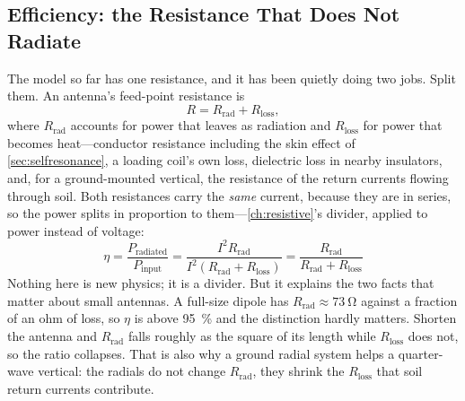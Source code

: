 \subsection{Efficiency: the Resistance That Does Not Radiate}
\label{sec:antennaeff}
The model so far has one resistance, and it has been quietly doing two jobs. Split
them. An antenna's feed-point resistance is
\[
R=R_{\text{rad}}+R_{\text{loss}},
\]
where \(R_{\text{rad}}\) accounts for power that leaves as radiation and
\(R_{\text{loss}}\) for power that becomes heat---conductor resistance including the
skin effect of \cref{sec:selfresonance}, a loading coil's own loss, dielectric loss in
nearby insulators, and, for a ground-mounted vertical, the resistance of the return
currents flowing through soil. Both resistances carry the \emph{same} current, because
they are in series, so the power splits in proportion to them---\cref{ch:resistive}'s
divider, applied to power instead of voltage:
\[
\boxed{\;\eta=\frac{P_{\text{radiated}}}{P_{\text{input}}}
=\frac{I^2R_{\text{rad}}}{I^2\left(R_{\text{rad}}+R_{\text{loss}}\right)}
=\frac{R_{\text{rad}}}{R_{\text{rad}}+R_{\text{loss}}}\;}
\]
Nothing here is new physics; it is a divider. But it explains the two facts that
matter about small antennas. A full-size dipole has \(R_{\text{rad}}\approx\SI{73}{\ohm}\)
against a fraction of an ohm of loss, so \(\eta\) is above \SI{95}{\percent} and the
distinction hardly matters. Shorten the antenna and \(R_{\text{rad}}\) falls
roughly as the square of its length while \(R_{\text{loss}}\) does not, so the ratio
collapses. That is also why a ground radial system helps a quarter-wave vertical: the
radials do not change \(R_{\text{rad}}\), they shrink the \(R_{\text{loss}}\)
that soil return currents contribute.

